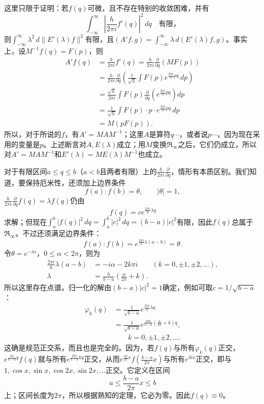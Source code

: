 \documentclass[fontsize=13pt,twoside,openany,headings=normal,parskip=false,bookmarkpackage=false,DIV=calc]{scrbook}
\begin{document}
这里只限于证明：若$f(q)$可微，且不存在特别的收敛困难，并有
\[
\int_{-\infty}^{\infty}|\frac{h}{2\pi i}f'(q)|^2\,dq\quad\text{有限，}
\]
则$\int_{-\infty}^{\infty}\lambda^2\,d\|E'(\lambda)f\|^2$有限，且$(A'f,\allowbreak g)=\int_{-\infty}^{\infty}\lambda\,d(E'(\lambda)f,\allowbreak g)$。事实上，设$M^{-1}f(q)=F(p)$，则
\begin{align*}
A'f(q)&=\frac{h}{2\pi i}f'(q)
=\frac{h}{2\pi i}\frac{\partial}{\partial q}(MF(p))\\
&=\frac{h}{2\pi i}\frac{\partial}{\partial q}\left(\frac1{\sqrt h}\int F(p)e^{\frac{2\pi i}{h}pq}\,dp\right)\\
&=\frac{\sqrt h}{2\pi i}\int F(p)\frac{\partial}{\partial q}\left(e^{\frac{2\pi i}{h}pq}\right)dp\\
&=\frac1{\sqrt h}\int F(p)\cdot p\cdot e^{\frac{2\pi i}{h}pq}\,dp\\
&=M(pF(p)).
\end{align*}
所以，对于所说的$f$，有$A'=MAM^{-1}$；这里$A$是算符$q\cdots$，或者说$p\cdots$，因为现在采用的变量是$p$。上述断言对$A,\allowbreak E(\lambda)$成立；用$M$变换$\mathfrak{R}_\infty$之后，它们仍成立，所以对$A'=MAM^{-1}$和$E'(\lambda)=ME(\lambda)M^{-1}$也成立。

\hypertarget{origpage-71}{}\label{origpage-71}对于有限区间$a\leq q\leq b$（$a<b$且两者有限）上的$\frac{h}{2\pi i}\frac{\partial}{\partial q}$，情形有本质区别。我们知道，要保持厄米性，还须加上边界条件
\[
f(a):f(b)=\theta,\qquad|\theta|=1,
\]
$\frac{h}{2\pi i}\frac{\partial}{\partial q}f(q)=\lambda f(q)$仍由
\[
f(q)=c e^{\frac{2\pi i}{h}\lambda q}
\]
求解；但现在$\int_a^b|f(q)|^2\,dq=\int_a^b|c|^2\,dq=(b-a)|c|^2$有限，因此$f(q)$总属于$\mathfrak{R}_\infty$。不过还须满足边界条件：
\[
f(a):f(b)=e^{\frac{2\pi i}{h}\lambda(a-b)}=\theta.
\]
令$\theta=e^{-i\alpha}$，$0\leq\alpha<2\pi$，则为
\begin{align*}
\frac{2\pi i}{h}\lambda(a-b)&=-i\alpha-2k\pi i\qquad(k=0,\pm1,\pm2,\ldots),\\
\lambda&=\frac h{b-a}\left(\frac\alpha{2\pi}+k\right).
\end{align*}
所以这里存在点谱。归一化的解由$(b-a)|c|^2=1$确定，例如可取$c=1/\sqrt{b-a}$：
\begin{align*}
\varphi_k(q)&=\frac1{\sqrt{b-a}}e^{\frac{2\pi i}{h}\lambda q}\\
&=\frac1{\sqrt{b-a}}e^{\frac{2\pi i}{b-a}(\frac\alpha{2\pi}+k)q},\\
&\qquad k=0,\pm1,\pm2,\ldots.
\end{align*}
这确是规范正交系，而且也是完全的。因为，若$f(q)$与所有$\varphi_k(q)$正交，$e^{\frac{\alpha i}{b-a}q}f(q)$就与所有$e^{\frac{2\pi i}{b-a}kq}$正交，从而$e^{\frac{\alpha i}{2\pi}x}f(\frac{b-a}{2\pi}x)$与所有$e^{ikx}$正交，即与$1,\allowbreak \cos x,\allowbreak \sin x,\allowbreak \cos2x,\allowbreak \sin2x,\allowbreak \ldots$正交。它定义在区间
\[
a\leq\frac{b-a}{2\pi}x\leq b
\]
上；区间长度为$2\pi$，所以根据熟知的定理，它必为零。因此$f(q)\equiv0$。
\end{document}

